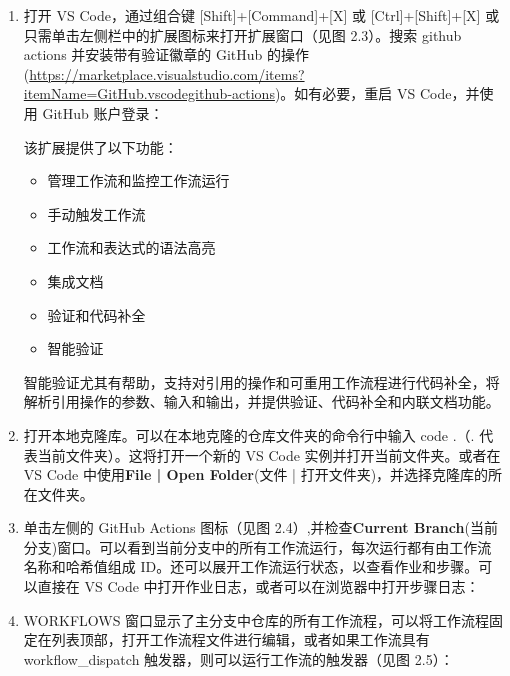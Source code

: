 \begin{enumerate}
\item 
打开 VS Code，通过组合键 [Shift]+[Command]+[X] 或 [Ctrl]+[Shift]+[X] 或只需单击左侧栏中的扩展图标来打开扩展窗口（见图 2.3）。搜索 github actions 并安装带有验证徽章的 GitHub 的操作(\url{https://marketplace.visualstudio.com/items?itemName=GitHub.vscodegithub-actions})。如有必要，重启 VS Code，并使用 GitHub 账户登录：


该扩展提供了以下功能：

\begin{itemize}
\item 
管理工作流和监控工作流运行

\item 
手动触发工作流

\item 
工作流和表达式的语法高亮

\item 
集成文档

\item 
验证和代码补全

\item 
智能验证
\end{itemize}

智能验证尤其有帮助，支持对引用的操作和可重用工作流程进行代码补全，将解析引用操作的参数、输入和输出，并提供验证、代码补全和内联文档功能。

\item 
打开本地克隆库。可以在本地克隆的仓库文件夹的命令行中输入 code .（. 代表当前文件夹）。这将打开一个新的 VS Code 实例并打开当前文件夹。或者在 VS Code 中使用\textbf{File | Open Folder}(文件 | 打开文件夹)，并选择克隆库的所在文件夹。

\item 
单击左侧的 GitHub Actions 图标（见图 2.4）,并检查\textbf{Current Branch}(当前分支)窗口。可以看到当前分支中的所有工作流运行，每次运行都有由工作流名称和哈希值组成 ID。还可以展开工作流运行状态，以查看作业和步骤。可以直接在 VS Code 中打开作业日志，或者可以在浏览器中打开步骤日志：


\item 
WORKFLOWS 窗口显示了主分支中仓库的所有工作流程，可以将工作流程固定在列表顶部，打开工作流程文件进行编辑，或者如果工作流具有 workflow\_dispatch 触发器，则可以运行工作流的触发器（见图 2.5）：


\end{enumerate}
